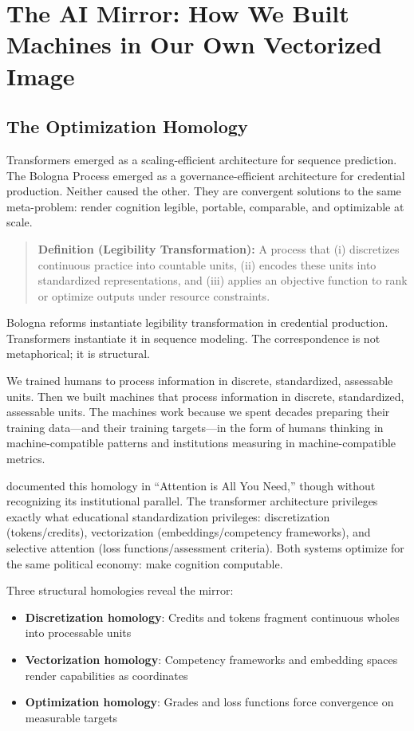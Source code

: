 \section{The AI Mirror: How We Built Machines in Our Own Vectorized Image}
\label{sec:ai-mirror}

\subsection{The Optimization Homology}

Transformers emerged as a scaling-efficient architecture for sequence prediction. The Bologna Process emerged as a governance-efficient architecture for credential production. Neither caused the other. They are convergent solutions to the same meta-problem: render cognition legible, portable, comparable, and optimizable at scale.

\begin{quote}
\textbf{Definition (Legibility Transformation):} A process that (i) discretizes continuous practice into countable units, (ii) encodes these units into standardized representations, and (iii) applies an objective function to rank or optimize outputs under resource constraints.
\end{quote}

Bologna reforms instantiate legibility transformation in credential production. Transformers instantiate it in sequence modeling. The correspondence is not metaphorical; it is structural.

We trained humans to process information in discrete, standardized, assessable units. Then we built machines that process information in discrete, standardized, assessable units. The machines work because we spent decades preparing their training data---and their training targets---in the form of humans thinking in machine-compatible patterns and institutions measuring in machine-compatible metrics.

\citet{vaswani2017} documented this homology in ``Attention is All You Need,'' though without recognizing its institutional parallel. The transformer architecture privileges exactly what educational standardization privileges: discretization (tokens/credits), vectorization (embeddings/competency frameworks), and selective attention (loss functions/assessment criteria). Both systems optimize for the same political economy: make cognition computable.

Three structural homologies reveal the mirror:
\begin{itemize}
\item \textbf{Discretization homology}: Credits and tokens fragment continuous wholes into processable units
\item \textbf{Vectorization homology}: Competency frameworks and embedding spaces render capabilities as coordinates
\item \textbf{Optimization homology}: Grades and loss functions force convergence on measurable targets
\end{itemize}


